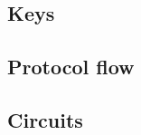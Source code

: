 
\subsection{Keys}
\label{sec:protocol:keys}


\subsection{Protocol flow}
\label{sec:protocol:flow}


\subsection{Circuits}
\label{sec:protocol:circuits}

